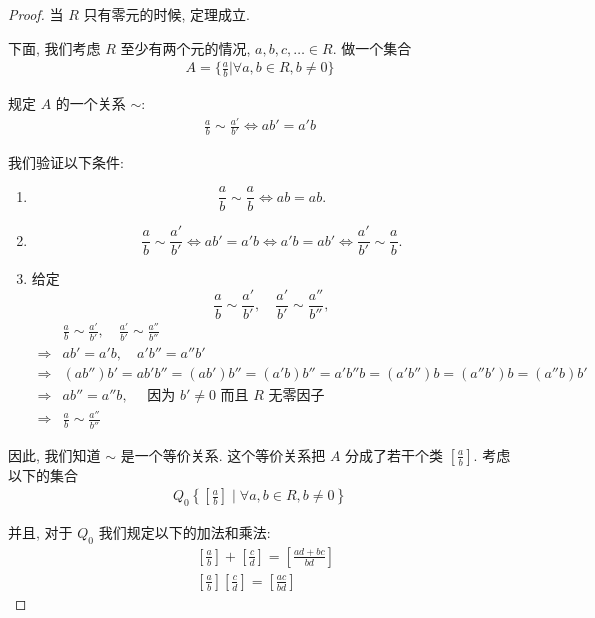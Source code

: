 \documentclass[utf8]{ctexbook}
\theoremstyle{definition}
\begin{document}
\begin{proof}
当 $R$ 只有零元的时候, 定理成立. 

下面, 我们考虑 $R$ 至少有两个元的情况, $a, b, c, \ldots \in R$. 做一个集合
\begin{align*}
A = \{ \frac{a}{b} | \forall a, b \in R, b \neq 0 \}
\end{align*}

规定 $A$ 的一个关系 $\sim$:
\begin{align*}
\frac{a}{b} 	\sim \frac{a'}{b'} \iff ab' = a' b
\end{align*}

我们验证以下条件:
\begin{enumerate}
\item{$$\frac{a}{b} \sim \frac{a}{b} \iff ab = ab . $$}
\item{$$ \frac{a}{b} \sim \frac{a'}{b'} \iff a b' = a' b \iff a'b = a b' \iff \frac{a'}{b'} \sim \frac{a}{b} . $$}
\item{给定 $$ \frac{a}{b} \sim \frac{a'}{b'} , \quad \frac{a'}{b'} \sim \frac{a''}{b''} , $$
\begin{align*}
& \frac{a}{b} \sim \frac{a'}{b'} , \quad \frac{a'}{b'} \sim \frac{a''}{b''}  \\
\Longrightarrow & ab' = a' b, \quad a' b'' = a'' b' \\
\Longrightarrow & (a b'') b' =  a b' b'' = (a b') b'' = (a' b) b'' = a' b'' b = (a' b'')b = (a'' b')b = (a'' b) b' \\
\Longrightarrow & a b '' = a'' b, \quad \mbox{ 因为 } b' \neq 0 \mbox{  而且  } R \mbox{  无零因子} \\
\Longrightarrow & \frac{a}{b} \sim \frac{a''}{b''}
\end{align*}
}
\end{enumerate}

因此, 我们知道 $\sim$ 是一个等价关系. 这个等价关系把 $A$ 分成了若干个类 $\left[ \frac{a}{b} \right]$. 考虑以下的集合
\begin{align*}
Q_0 \left \{ \left[ \frac{a}{b} \right]  \mid \forall a , b \in R , b \neq 0 \right \}
\end{align*}

并且, 对于 $Q_0$ 我们规定以下的加法和乘法:
\begin{align*}
& \left[ \frac{a}{b} \right] + \left[ \frac{c}{d} \right] = \left[ \frac{ad + bc }{bd} \right] \\
& \left[ \frac{a}{b} \right] \left[ \frac{c}{d} \right] = \left[ \frac{ac}{bd} \right]
\end{align*}


\end{proof}
\end{document}
